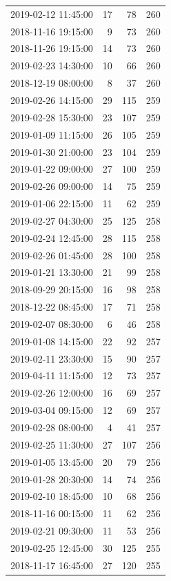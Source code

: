 \begin{tabular}{lrrr}
2019-02-12 11:45:00 & 17 & 78 & 260 \\
2018-11-16 19:15:00 & 9 & 73 & 260 \\
2018-11-26 19:15:00 & 14 & 73 & 260 \\
2019-02-23 14:30:00 & 10 & 66 & 260 \\
2018-12-19 08:00:00 & 8 & 37 & 260 \\
2019-02-26 14:15:00 & 29 & 115 & 259 \\
2019-02-28 15:30:00 & 23 & 107 & 259 \\
2019-01-09 11:15:00 & 26 & 105 & 259 \\
2019-01-30 21:00:00 & 23 & 104 & 259 \\
2019-01-22 09:00:00 & 27 & 100 & 259 \\
2019-02-26 09:00:00 & 14 & 75 & 259 \\
2019-01-06 22:15:00 & 11 & 62 & 259 \\
2019-02-27 04:30:00 & 25 & 125 & 258 \\
2019-02-24 12:45:00 & 28 & 115 & 258 \\
2019-02-26 01:45:00 & 28 & 100 & 258 \\
2019-01-21 13:30:00 & 21 & 99 & 258 \\
2018-09-29 20:15:00 & 16 & 98 & 258 \\
2018-12-22 08:45:00 & 17 & 71 & 258 \\
2019-02-07 08:30:00 & 6 & 46 & 258 \\
2019-01-08 14:15:00 & 22 & 92 & 257 \\
2019-02-11 23:30:00 & 15 & 90 & 257 \\
2019-04-11 11:15:00 & 12 & 73 & 257 \\
2019-02-26 12:00:00 & 16 & 69 & 257 \\
2019-03-04 09:15:00 & 12 & 69 & 257 \\
2019-02-28 08:00:00 & 4 & 41 & 257 \\
2019-02-25 11:30:00 & 27 & 107 & 256 \\
2019-01-05 13:45:00 & 20 & 79 & 256 \\
2019-01-28 20:30:00 & 14 & 74 & 256 \\
2019-02-10 18:45:00 & 10 & 68 & 256 \\
2018-11-16 00:15:00 & 11 & 62 & 256 \\
2019-02-21 09:30:00 & 11 & 53 & 256 \\
2019-02-25 12:45:00 & 30 & 125 & 255 \\
2018-11-17 16:45:00 & 27 & 120 & 255 \\

\end{tabular}
